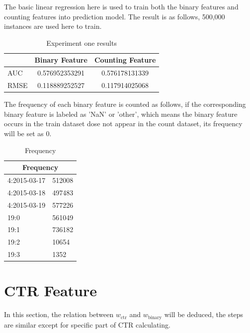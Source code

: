 \documentclass{article}
\begin{document}
 The basic linear regression here is used to train both the binary features and counting features into prediction model. The result is as follows, 500,000 instances are used here to train.

\begin{table}[h]
\setlength{\parindent}{17ex}
\begin{tabular}{l | c | c }
  & Binary Feature & Counting Feature\\
\hline \hline
AUC & 0.576952353291
 & 0.576178131339 \\
 
RMSE & 0.118889252527 & 0.117914025068


\end{tabular}
\caption{Experiment one results}
\label{tab:tri}
\end{table}
The frequency of each binary feature is counted as follows, if the corresponding binary feature is labeled as 'NaN' or 'other', which means the binary feature occurs in the train dataset dose not appear in the count dataset, its frequency will be set as 0. \vspace{3mm}



\begin{table}[h]
\setlength{\parindent}{17ex}
\begin{tabular}{ |p{3cm}||p{3cm}|  }
 \hline
 \multicolumn{2}{|c|}{Frequency} \\
 \hline
    4:2015-03-17 & 512008  \\
    4:2015-03-18 & 497483 \\
    4:2015-03-19 & 577226\\
  19:0 & 561049\\
  19:1 & 736182\\
  19:2 & 10654 \\
  19:3 & 1352\\
  
 \hline
\end{tabular}
\caption{Frequency}
\label{tab:tri}
\end{table}\vspace{3mm}


\section{CTR Feature}

\setlength{\parindent}{5ex}

In this section, the relation between  \(w_{\text{ctr}}\) and \(w_{\text{binary}}\) will be deduced, the steps are similar except for specific part of CTR calculating. \vspace{3mm}
\end{document}
